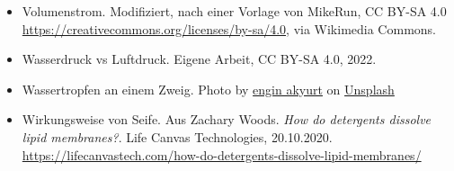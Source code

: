 \documentclass{beamer}
\begin{document}
\begin{frame}
\begin{tiny}
\begin{itemize}
\item 
Volumenstrom. Modifiziert, nach einer Vorlage von MikeRun, CC BY-SA 4.0 \url{https://creativecommons.org/licenses/by-sa/4.0}, via Wikimedia Commons.

\item
Wasserdruck vs Luftdruck. Eigene Arbeit, CC BY-SA 4.0, 2022.

\item
Wassertropfen an einem Zweig. Photo by \href{https://unsplash.com/@enginakyurt?utm_source=unsplash&utm_medium=referral&utm_content=creditCopyText}{engin akyurt} on \href{https://unsplash.com/s/photos/drop?utm_source=unsplash&utm_medium=referral&utm_content=creditCopyText}{Unsplash}
  
\item
Wirkungsweise von Seife. Aus Zachary Woods. \emph{How do detergents dissolve lipid membranes?}. Life Canvas Technologies, 20.10.2020. \url{https://lifecanvastech.com/how-do-detergents-dissolve-lipid-membranes/}


\end{itemize}
\end{tiny}
\end{frame}
\end{document}
